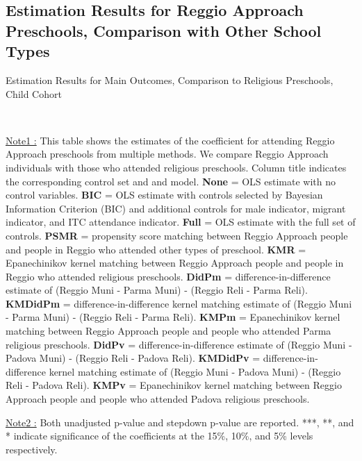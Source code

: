 \subsection{Estimation Results for Reggio Approach Preschools, Comparison with Other School Types} \label{app:comparison-reli-stat}


\begin{table}[H] \caption{Estimation Results for Main Outcomes, Comparison to Religious Preschools, Child Cohort} \label{ols-M-child-reg-reli}
\scalebox{0.59}{}
\vspace{1ex} \\
\footnotesize\raggedright{\underline{Note1 :} This table shows the estimates of the coefficient for attending Reggio Approach preschools from multiple methods. We compare Reggio Approach individuals with those who attended religious preschools. Column title indicates the corresponding control set and and model. \textbf{None} = OLS estimate with no control variables. \textbf{BIC} = OLS estimate with controls selected by Bayesian Information Criterion (BIC) and additional controls for male indicator, migrant indicator, and ITC attendance indicator. \textbf{Full} = OLS estimate with the full set of controls. \textbf{PSMR} =  propensity score matching between Reggio Approach people and people in Reggio who attended other types of preschool. \textbf{KMR} = Epanechinikov kernel matching between Reggio Approach people and people in Reggio who attended religious preschools. \textbf{DidPm} = difference-in-difference estimate of (Reggio Muni - Parma Muni) - (Reggio Reli - Parma Reli). \textbf{KMDidPm} = difference-in-difference kernel matching estimate of (Reggio Muni - Parma Muni) - (Reggio Reli - Parma Reli). \textbf{KMPm} = Epanechinikov kernel matching between Reggio Approach people and people who attended Parma religious preschools. \textbf{DidPv} = difference-in-difference estimate of (Reggio Muni - Padova Muni) - (Reggio Reli - Padova Reli). \textbf{KMDidPv} = difference-in-difference kernel matching estimate of (Reggio Muni - Padova Muni) - (Reggio Reli - Padova Reli).  \textbf{KMPv} = Epanechinikov kernel matching between Reggio Approach people and people who attended Padova religious preschools.} 

\footnotesize\raggedright{\underline{Note2 :} Both unadjusted p-value and stepdown p-value are reported. ***, **, and * indicate significance of the coefficients at the 15\%, 10\%, and 5\% levels respectively.}

\end{table}



